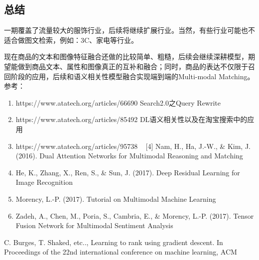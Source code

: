\subsection{总结}
一期覆盖了流量较大的服饰行业，后续将继续扩展行业。当然，有些行业可能也不适合做图文检索，例如：3C、家电等行业。
\par 现在商品的文本和图像特征融合还做的比较简单、粗糙，后续会继续深耕模型，期望能做到商品文本、属性和图像真正的互补和融合；同时，商品的表达不仅限于召回阶段的应用，后续和语义相关性模型融合实现端到端的Multi-modal Matching。
\newline 参考：
\begin{enumerate}
\item https://www.atatech.org/articles/66690 Search2.0之Query Rewrite
\item https://www.atatech.org/articles/85492 DL语义相关性以及在淘宝搜索中的应用
\item https://www.atatech.org/articles/95738   [4] Nam, H., Ha, J.-W., \& Kim, J. (2016). Dual Attention Networks for Multimodal Reasoning and Matching
\item He, K., Zhang, X., Ren, S., \& Sun, J. (2017). Deep Residual Learning for Image Recognition
\item Morency, L.-P. (2017). Tutorial on Multimodal Machine Learning
\item Zadeh, A., Chen, M., Poria, S., Cambria, E., \& Morency, L.-P. (2017). Tensor Fusion Network for Multimodal Sentiment Analysis
\end{enumerate}



\begin{thebibliography}{99}
 C. Burges, T. Shaked, etc.., Learning to rank 
using gradient descent. In Proceedings of the 22nd international 
conference on machine learning, ACM
\end{thebibliography}

 
